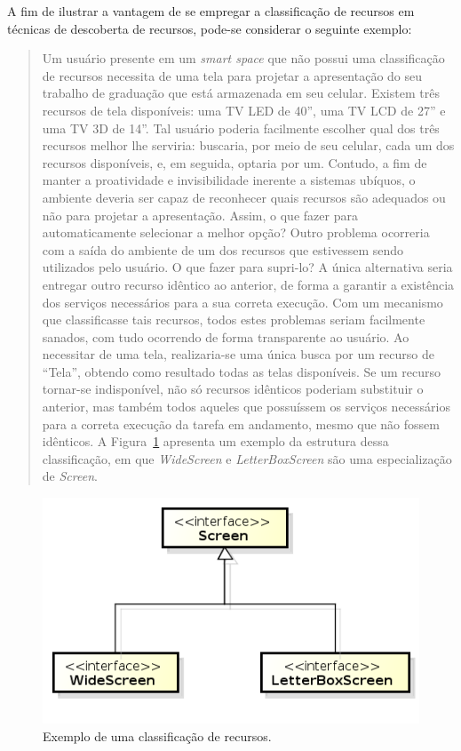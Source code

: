 A fim de ilustrar a vantagem de se empregar a classificação de recursos em técnicas de descoberta de recursos, pode-se considerar o seguinte exemplo:

\begin{quote}
	Um usuário presente em um \emph{smart space} que não possui uma classificação de recursos necessita de uma tela para projetar a apresentação do seu trabalho de graduação que está armazenada em seu celular. Existem três recursos de tela disponíveis: uma TV LED de 40'', uma TV LCD de 27'' e uma TV 3D de 14''. Tal usuário poderia facilmente escolher qual dos três recursos melhor lhe serviria: buscaria, por meio de seu celular, cada um dos recursos disponíveis, e, em seguida, optaria por um. Contudo, a fim de manter a proatividade e invisibilidade inerente a sistemas ubíquos, o ambiente deveria ser capaz de reconhecer quais recursos são adequados ou não para projetar a apresentação. Assim, o que fazer para automaticamente selecionar a melhor opção? Outro problema ocorreria com a saída do ambiente de um dos recursos que estivessem sendo utilizados pelo usuário. O que fazer para supri-lo? A única alternativa seria entregar outro recurso idêntico ao anterior, de forma a garantir a existência dos serviços necessários para a sua correta execução. Com um mecanismo que classificasse tais recursos, todos estes problemas seriam facilmente sanados, com tudo ocorrendo de forma transparente ao usuário. Ao necessitar de uma tela, realizaria-se uma única busca por um recurso de ``Tela'', obtendo como resultado todas as telas disponíveis. Se um recurso tornar-se indisponível, não só recursos idênticos poderiam substituir o anterior, mas também todos aqueles que possuíssem os serviços necessários para a correta execução da tarefa em andamento, mesmo que não fossem idênticos. A Figura~\ref{fig:arvoreDeEquivalencia} apresenta um exemplo da estrutura dessa classificação, em que \emph{WideScreen} e \emph{LetterBoxScreen} são uma especialização de \emph{Screen}.
\end{quote}

\begin{figure}[ht]
	\center
	\includegraphics[scale=0.9]{imagens/screenTree}
	\caption{Exemplo de uma classificação de recursos.}
	\label{fig:arvoreDeEquivalencia}
\end{figure}

